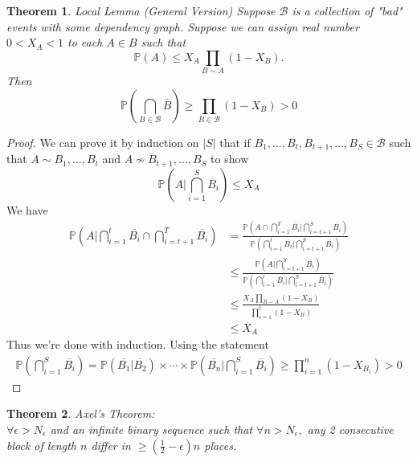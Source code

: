 \documentclass[a4paper]{article}
\newtheorem{thm}{Theorem}[section]
\begin{document}
\begin{thm}
    Local Lemma (General Version) Suppose $\mathcal{B}$ is a collection of "bad" events with some dependency graph. Suppose we can assign real number $0<X_A<1$ to each $A\in B$ such that $$\mathbb{P}(A)\leq X_A\prod_{B\sim A}(1-X_B).$$ Then $$\mathbb{P}\left (\bigcap_{B\in \mathcal{B}}\overline{B} \right )\geq \prod_{B\in \mathcal{B}}(1-X_B)> 0$$
 \end{thm}
 \begin{proof}
    We can prove it by induction on $|S|$ that if $B_1,...,B_t,B_{t+1},...,B_S\in \mathcal{B}$ such that $A\sim B_1,...,B_t$ and $A\not \sim B_{t+1},...,B_{S}$ to show $$\mathbb{P}\left (A | \bigcap_{i=1}^S \overline{B_i}\right )\leq X_A$$ 
    We have \begin{align*}
        \mathbb{P}\left (A | \bigcap_{i=1}^t \overline{B_i}\cap \bigcap_{i=t+1}^T \overline{B_i}  \right ) &=\frac{\mathbb{P}\left (A \cap \bigcap_{i=1}^T \overline{B_i} | \bigcap_{i=t+1}^S \overline{B_i} \right )}{\mathbb{P}(\bigcap_{i=1}^t \overline{B_i} | \bigcap_{i=t+1}^S \overline{B_i})}\\
        &\leq \frac{\mathbb{P}\left (A| \bigcap_{i=t+1}^S \overline{B_i} \right )}{\mathbb{P}(\bigcap_{i=1}^t \overline{B_i} | \bigcap_{i=t+1}^S \overline{B_i})}\\
        &\leq \frac{X_A\prod_{B\sim A}(1-X_B)}{\prod_{i=1}^t(1-X_B)}\\
        &\leq X_A
    \end{align*}
    Thus we're done with induction.
    Using the statement \begin{align*}
        \mathbb{P}\left (\bigcap_{i=1}^S \overline{B_i}\right )=\mathbb{P}\left ( \overline{B_1} |\overline{B_2}\right )\times \cdots \times \mathbb{P}\left ( \overline{B_n} | \bigcap_{i=1}^S \overline{B_i}\right ) \geq \prod_{i=1}^n (1-X_{B_i})>0   
    \end{align*}
\end{proof}
 \begin{thm}
     Axel's Theorem: \\ $\forall \epsilon > N_\epsilon$ and an infinite binary sequence such that $\forall n>N_\epsilon,$ any 2 consecutive block of length $n$ differ in $\geq \left (\frac{1}{2}-\epsilon \right )n$ places. 
\end{thm}
\end{document}
